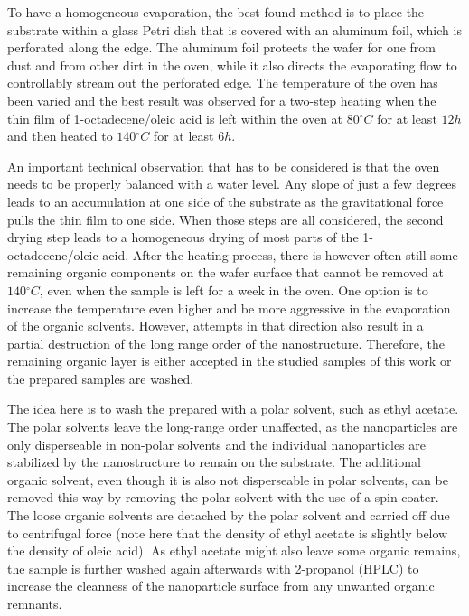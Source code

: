 \documentclass[\main/dresen_thesis.tex]{subfiles}
\begin{document}
    To have a homogeneous evaporation, the best found method is to place the substrate within a glass Petri dish that is covered with an aluminum foil, which is perforated along the edge.
    The aluminum foil protects the wafer for one from dust and from other dirt in the oven, while it also directs the evaporating flow to controllably stream out the perforated edge.
    The temperature of the oven has been varied and the best result was observed for a two-step heating when the thin film of 1-octadecene/oleic acid is left within the oven at $80 \unit{^\circ C}$ for at least $12\unit{h}$ and then heated to $140 \unit{^\circ C}$ for at least $6\unit{h}$.

    An important technical observation that has to be considered is that the oven needs to be properly balanced with a water level.
    Any slope of just a few degrees leads to an accumulation at one side of the substrate as the gravitational force pulls the thin film to one side.
    When those steps are all considered, the second drying step leads to a homogeneous drying of most parts of the 1-octadecene/oleic acid.
    After the heating process, there is however often still some remaining organic components on the wafer surface that cannot be removed at $140 \unit{^\circ C}$, even when the sample is left for a week in the oven.
    One option is to increase the temperature even higher and be more aggressive in the evaporation of the organic solvents.
    However, attempts in that direction also result in a partial destruction of the long range order of the nanostructure.
    Therefore, the remaining organic layer is either accepted in the studied samples of this work or the prepared samples are washed.

    The idea here is to wash the prepared with a polar solvent, such as ethyl acetate.
    The polar solvents leave the long-range order unaffected, as the nanoparticles are only disperseable in non-polar solvents and the individual nanoparticles are stabilized by the nanostructure to remain on the substrate.
    The additional organic solvent, even though it is also not disperseable in polar solvents, can be removed this way by removing the polar solvent with the use of a spin coater.
    The loose organic solvents are detached by the polar solvent and carried off due to centrifugal force (note here that the density of ethyl acetate is slightly below the density of oleic acid).
    As ethyl acetate might also leave some organic remains, the sample is further washed again afterwards with 2-propanol (HPLC) to increase the cleanness of the nanoparticle surface from any unwanted organic remnants.
\end{document}
